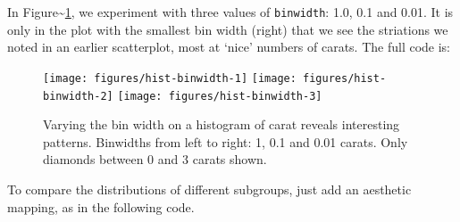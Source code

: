 In Figure\textasciitilde{}\ref{fig:hist-binwidth}, we experiment with
three values of \texttt{binwidth}: 1.0, 0.1 and 0.01. It is only in the
plot with the smallest bin width (right) that we see the striations we
noted in an earlier scatterplot, most at `nice' numbers of carats. The
full code is:

\begin{Shaded}
\begin{Highlighting}[]
  \NormalTok{, } \NormalTok{, }
   \NormalTok{(}\NormalTok{,}\NormalTok{))}
  \NormalTok{, } \NormalTok{,}
   \NormalTok{(}\NormalTok{,}\NormalTok{))}
  \NormalTok{, } \NormalTok{,}
   \NormalTok{(}\NormalTok{,}\NormalTok{))}
\end{Highlighting}
\end{Shaded}

\begin{figure}
\texttt{[image: figures/hist-binwidth-1]} \texttt{[image: figures/hist-binwidth-2]} \texttt{[image: figures/hist-binwidth-3]} \caption{Varying the bin width on a histogram of carat reveals interesting patterns.  Binwidths from left to right: 1, 0.1 and 0.01 carats. Only diamonds between 0 and 3 carats shown.\label{fig:hist-binwidth}}
\end{figure}

To compare the distributions of different subgroups, just add an
aesthetic mapping, as in the following code.

\begin{Shaded}
\begin{Highlighting}[]
  \NormalTok{, } 
  \NormalTok{, } 
\end{Highlighting}
\end{Shaded}


